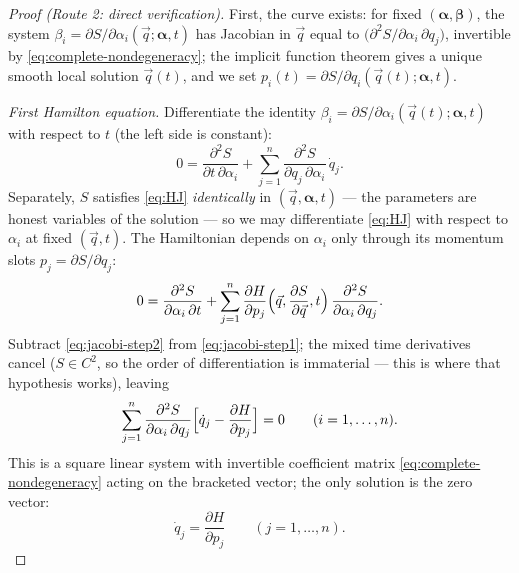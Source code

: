 \documentclass[11pt]{article}
\theoremstyle{plain}
\theoremstyle{definition}
\theoremstyle{remark}
\newcommand{\pd}[2]{\frac{\partial #1}{\partial #2}}
\newcommand{\vq}{\vec{q}}
\begin{document}
\begin{proof}[Proof (Route 2: direct verification)]
First, the curve exists: for fixed $(\boldsymbol{\alpha},
\boldsymbol{\beta})$, the system
$\beta_i = \partial S/\partial\alpha_i(\vq; \boldsymbol{\alpha}, t)$
has Jacobian in $\vq$ equal to
$\bigl(\partial^2 S/\partial\alpha_i\,\partial q_j\bigr)$, invertible
by \eqref{eq:complete-nondegeneracy}; the implicit function theorem
gives a unique smooth local solution $\vq(t)$, and we set
$p_i(t) = \partial S/\partial q_i(\vq(t); \boldsymbol{\alpha}, t)$.

\emph{First Hamilton equation.} Differentiate the identity
$\beta_i = \partial S/\partial\alpha_i(\vq(t); \boldsymbol{\alpha}, t)$
with respect to $t$ (the left side is constant):
\begin{equation}
  0 = \frac{\partial^2 S}{\partial t\,\partial\alpha_i}
    + \sum_{j=1}^{n}
      \frac{\partial^2 S}{\partial q_j\,\partial\alpha_i}\,\dot q_j .
  \label{eq:jacobi-step1}
\end{equation}
Separately, $S$ satisfies \eqref{eq:HJ} \emph{identically} in
$(\vq, \boldsymbol{\alpha}, t)$ --- the parameters are honest variables
of the solution --- so we may differentiate \eqref{eq:HJ} with respect
to $\alpha_i$ at fixed $(\vq, t)$. The Hamiltonian depends on
$\alpha_i$ only through its momentum slots
$p_j = \partial S/\partial q_j$:
\begin{equation}
  0 = \frac{\partial^2 S}{\partial\alpha_i\,\partial t}
    + \sum_{j=1}^{n}
      \pd{H}{p_j}\Bigl(\vq, \pd{S}{\vq}, t\Bigr)\,
      \frac{\partial^2 S}{\partial\alpha_i\,\partial q_j} .
  \label{eq:jacobi-step2}
\end{equation}
Subtract \eqref{eq:jacobi-step2} from \eqref{eq:jacobi-step1}; the
mixed time derivatives cancel ($S \in C^2$, so the order of
differentiation is immaterial --- this is where that hypothesis
works), leaving
\begin{equation}
  \sum_{j=1}^{n}
  \frac{\partial^2 S}{\partial\alpha_i\,\partial q_j}
  \Bigl[\dot q_j - \pd{H}{p_j}\Bigr] = 0
  \qquad (i = 1, \dots, n) .
\end{equation}
This is a square linear system with invertible coefficient matrix
\eqref{eq:complete-nondegeneracy} acting on the bracketed vector; the
only solution is the zero vector:
\begin{equation}
  \dot q_j = \pd{H}{p_j} \qquad (j = 1, \dots, n) .
  \label{eq:jacobi-q}
\end{equation}


\end{proof}
\end{document}
